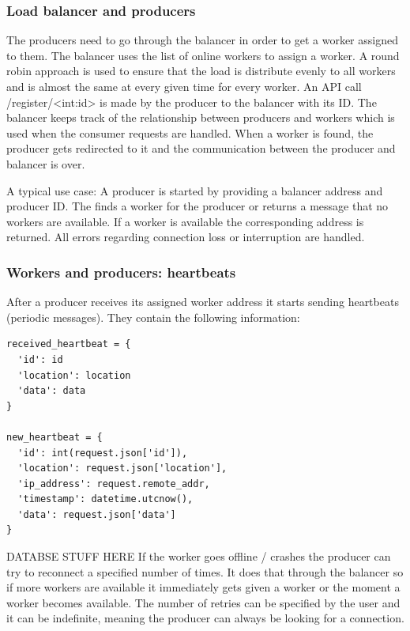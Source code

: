\documentclass{sigchi}
\begin{document}
\subsubsection{Load balancer and producers}

The producers need to go through the balancer in order to get a worker assigned to them. The balancer uses the list of online workers to assign a worker. A round robin approach is used to ensure that the load is distribute evenly to all workers and is almost the same at every given time for every worker.
An API call /register/<int:id> is made by the producer to the balancer with its ID. The balancer keeps track of the relationship between producers and workers which is used when the consumer requests are handled. When a worker is found, the producer gets redirected to it and the communication between the producer and balancer is over.

A typical use case:
A producer is started by providing a balancer address and producer ID. The finds a worker for the producer or returns a message that no workers are available. If a worker is available the corresponding address is returned. All errors regarding connection loss or interruption are handled.

\subsubsection{Workers and producers: heartbeats}

After a producer receives its assigned worker address it starts sending heartbeats (periodic messages). They contain the following information:

\vspace*{\baselineskip}
\begin{lstlisting}[caption={Heartbeat format}, mathescape, upquote=true]
received_heartbeat = {
  'id': id
  'location': location
  'data': data
}

new_heartbeat = {
  'id': int(request.json['id']),
  'location': request.json['location'],
  'ip_address': request.remote_addr,
  'timestamp': datetime.utcnow(),
  'data': request.json['data']
}
\end{lstlisting}

DATABSE STUFF HERE
If the worker goes offline / crashes the producer can try to reconnect a specified number of times. It does that through the balancer so if more workers are available it immediately gets given a worker or the moment a worker becomes available. The number of retries can be specified by the user and it can be indefinite, meaning the producer can always be looking for a connection.
\end{document}
